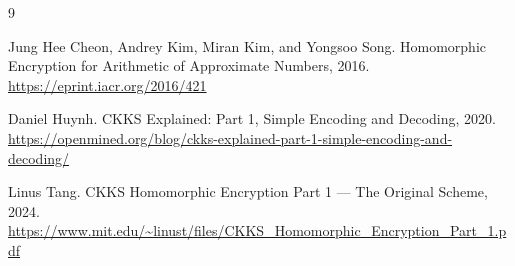 \documentclass[11pt,a4paper]{article}
\begin{document}
\begin{thebibliography}{9}

Jung Hee Cheon, Andrey Kim, Miran Kim, and Yongsoo Song.
\newblock Homomorphic Encryption for Arithmetic of Approximate Numbers, 2016.
\newblock \url{https://eprint.iacr.org/2016/421}

Daniel Huynh.
\newblock CKKS Explained: Part 1, Simple Encoding and Decoding, 2020.
\newblock \url{https://openmined.org/blog/ckks-explained-part-1-simple-encoding-and-decoding/}

Linus Tang.
\newblock CKKS Homomorphic Encryption Part 1 --- The Original Scheme, 2024.
\url{https://www.mit.edu/~linust/files/CKKS_Homomorphic_Encryption_Part_1.pdf}

\end{thebibliography}

\newpage
\end{document}
